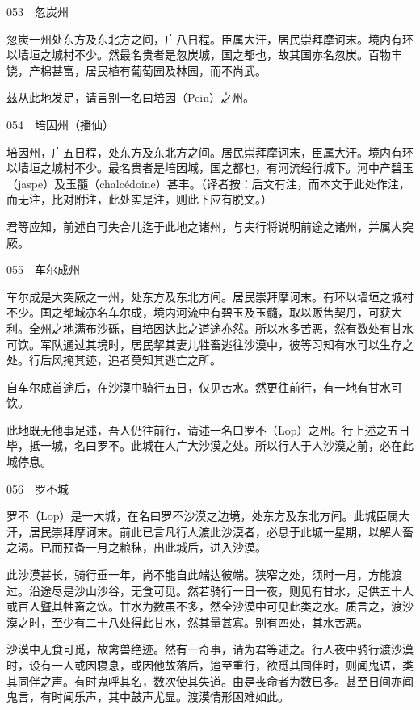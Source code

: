 \documentclass[12pt,UTF8]{ctexbook}
\begin{document}
053　忽炭州

忽炭一州处东方及东北方之间，广八日程。臣属大汗，居民崇拜摩诃末。境内有环以墙垣之城村不少。然最名贵者是忽炭城，国之都也，故其国亦名忽炭。百物丰饶，产棉甚富，居民植有葡萄园及林园，而不尚武。

兹从此地发足，请言别一名曰培因（Pein）之州。





054　培因州（播仙）

培因州，广五日程，处东方及东北方之间。居民崇拜摩诃末，臣属大汗。境内有环以墙垣之城村不少。最名贵者是培因城，国之都也，有河流经行城下。河中产碧玉（jaspe）及玉髓（chalcédoine）甚丰。（译者按：后文有注，而本文于此处作注，而无注，比对附注，此处实是注，则此下应有脱文。）

君等应知，前述自可失合儿迄于此地之诸州，与夫行将说明前途之诸州，并属大突厥。





055　车尔成州

车尔成是大突厥之一州，处东方及东北方间。居民崇拜摩诃末。有环以墙垣之城村不少。国之都城亦名车尔成，境内河流中有碧玉及玉髓，取以贩售契丹，可获大利。全州之地满布沙砾，自培因达此之道途亦然。所以水多苦恶，然有数处有甘水可饮。军队通过其境时，居民挈其妻儿牲畜逃往沙漠中，彼等习知有水可以生存之处。行后风掩其迹，追者莫知其逃亡之所。

自车尔成首途后，在沙漠中骑行五日，仅见苦水。然更往前行，有一地有甘水可饮。

此地既无他事足述，吾人仍往前行，请述一名曰罗不（Lop）之州。行上述之五日毕，抵一城，名曰罗不。此城在人广大沙漠之处。所以行人于人沙漠之前，必在此城停息。





056　罗不城

罗不（Lop）是一大城，在名曰罗不沙漠之边境，处东方及东北方间。此城臣属大汗，居民崇拜摩诃末。前此已言凡行人渡此沙漠者，必息于此城一星期，以解人畜之渴。已而预备一月之粮秣，出此城后，进入沙漠。

此沙漠甚长，骑行垂一年，尚不能自此端达彼端。狭窄之处，须时一月，方能渡过。沿途尽是沙山沙谷，无食可觅。然若骑行一日一夜，则见有甘水，足供五十人或百人暨其牲畜之饮。甘水为数虽不多，然全沙漠中可见此类之水。质言之，渡沙漠之时，至少有二十八处得此甘水，然其量甚寡。别有四处，其水苦恶。

沙漠中无食可觅，故禽兽绝迹。然有一奇事，请为君等述之。行人夜中骑行渡沙漠时，设有一人或因寝息，或因他故落后，迨至重行，欲觅其同伴时，则闻鬼语，类其同伴之声。有时鬼呼其名，数次使其失道。由是丧命者为数已多。甚至日间亦闻鬼言，有时闻乐声，其中鼓声尤显。渡漠情形困难如此。
\end{document}
